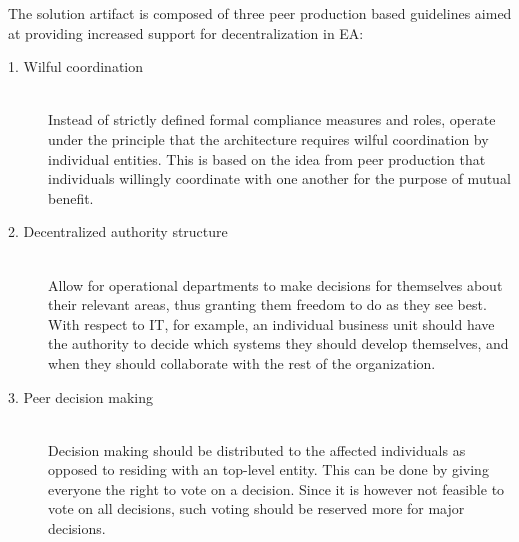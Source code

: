The solution artifact is composed of three peer production based guidelines aimed at providing increased support for decentralization in EA:

\begin{description}
\item[1. Wilful coordination] \hfill \\ Instead of strictly defined formal compliance measures and roles, operate under the principle that the architecture requires wilful coordination by individual entities. This is based on the idea from peer production that individuals willingly coordinate with one another for the purpose of mutual benefit.

\item[2. Decentralized authority structure] \hfill \\ Allow for operational departments to make decisions for themselves about their relevant areas, thus granting them freedom to do as they see best. With respect to IT, for example, an individual business unit should have the authority to decide which systems they should develop themselves, and when they should collaborate with the rest of the organization. 

\item[3. Peer decision making] \hfill \\ Decision making should be distributed to the affected individuals as opposed to residing with an top-level entity. This can be done by giving everyone the right to vote on a decision. Since it is however not feasible to vote on all decisions, such voting should be reserved more for major decisions. 
\end{description}